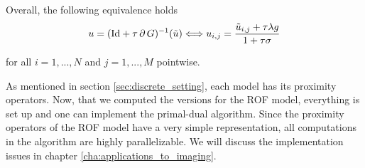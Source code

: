         Overall, the following equivalence holds
            \begin{equation}
                u = (\textnormal{Id} + \tau\,\partial\,G)^{-1}(\tilde{u}) \Longleftrightarrow u_{i,j} = \frac{\tilde{u}_{i,j} + \tau\lambda g}{1 + \tau\sigma}
            \label{eq:proximity_operator_g_rof}
            \end{equation}

        for all $i = 1, ..., N$ and $j = 1, ..., M$ pointwise.

        As mentioned in section \ref{sec:discrete_setting}, each model has its proximity operators. Now, that we computed the versions for the ROF model, everything is set up and one can implement the primal-dual algorithm. Since the proximity operators of the ROF model have a very simple representation, all computations in the algorithm are highly parallelizable. We will discuss the implementation issues in chapter \ref{cha:applications_to_imaging}.


